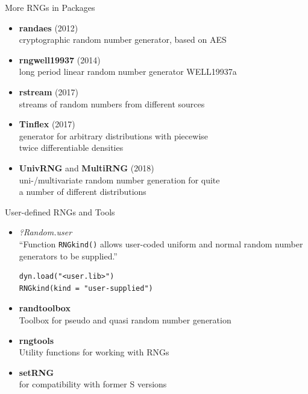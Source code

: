 \documentclass[ignorenonframetext,]{beamer}
\begin{document}
\begin{frame}{More RNGs in Packages}
\protect\hypertarget{more-rngs-in-packages}{}

\begin{itemize}
\item
  \textbf{randaes} (2012)\\
  cryptographic random number generator, based on AES
\item
  \textbf{rngwell19937} (2014)\\
  long period linear random number generator WELL19937a
\item
  \textbf{rstream} (2017)\\
  streams of random numbers from different sources
\item
  \textbf{Tinflex} (2017)\\
  generator for arbitrary distributions with piecewise\\
  twice differentiable densities
\item
  \textbf{UnivRNG} and \textbf{MultiRNG} (2018)\\
  uni-/multivariate random number generation for quite\\
  a number of different distributions
\end{itemize}

\end{frame}

\begin{frame}[fragile]{User-defined RNGs and Tools}
\protect\hypertarget{user-defined-rngs-and-tools}{}

\begin{itemize}
\item
  \emph{?Random.user}\\
  ``Function \texttt{RNGkind()} allows user-coded uniform and normal
  random number generators to be supplied.''

\begin{verbatim}
dyn.load("<user.lib>")
RNGkind(kind = "user-supplied")
\end{verbatim}
\item
  \textbf{randtoolbox}\\
  Toolbox for pseudo and quasi random number generation
\item
  \textbf{rngtools}\\
  Utility functions for working with RNGs
\item
  \textbf{setRNG}\\
  for compatibility with former S versions
\end{itemize}

\end{frame}
\end{document}
